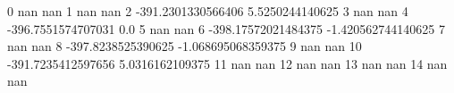 0 nan nan
1 nan nan
2 -391.2301330566406 5.5250244140625
3 nan nan
4 -396.7551574707031 0.0
5 nan nan
6 -398.17572021484375 -1.420562744140625
7 nan nan
8 -397.8238525390625 -1.068695068359375
9 nan nan
10 -391.7235412597656 5.0316162109375
11 nan nan
12 nan nan
13 nan nan
14 nan nan
